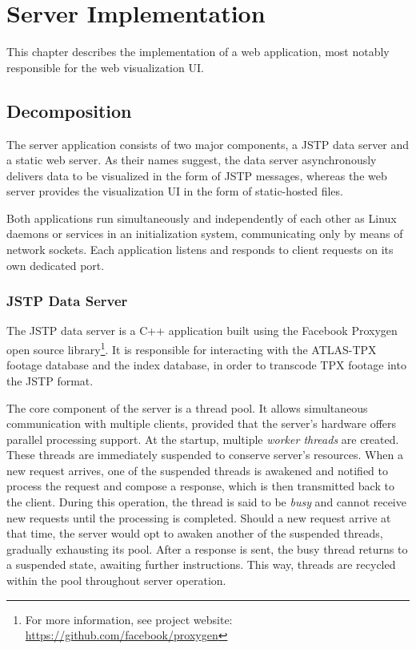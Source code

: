 \chapter{Server Implementation}
\label{chapter:server}
This chapter describes the implementation of a web application, most notably responsible for the web visualization UI.

\section{Decomposition}
The server application consists of two major components, a JSTP data server and a static web server. As their names suggest, the data server asynchronously delivers data to be visualized in the form of JSTP messages, whereas the web server provides the visualization UI in the form of static-hosted files.

Both applications run simultaneously and independently of each other as Linux daemons or services in an initialization system, communicating only by means of network sockets. Each application listens and responds to client requests on its own dedicated port.

\subsection{JSTP Data Server}
The JSTP data server is a C++ application built using the Facebook Proxygen open source library\footnote{For more information, see project website: \url{https://github.com/facebook/proxygen}}. It is responsible for interacting with the ATLAS-TPX footage database and the index database, in order to transcode TPX footage into the JSTP format.

The core component of the server is a thread pool. It allows simultaneous communication with multiple clients, provided that the server's hardware offers parallel processing support. At the startup, multiple \textit{worker threads} are created. These threads are immediately suspended to conserve server's resources. When a new request arrives, one of the suspended threads is awakened and notified to process the request and compose a response, which is then transmitted back to the client. During this operation, the thread is said to be \textit{busy} and cannot receive new requests until the processing is completed. Should a new request arrive at that time, the server would opt to awaken another of the suspended threads, gradually exhausting its pool. After a response is sent, the busy thread returns to a suspended state, awaiting further instructions. This way, threads are recycled within the pool throughout server operation.

